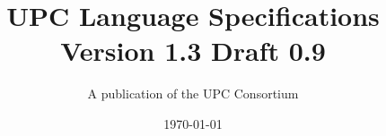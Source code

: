 \newcommand{\myversion}{Version 1.3 Draft 0.9}
\newcommand{\mytitle}{UPC Language Specifications}


\makeindex

\title{\mytitle\\
\myversion}

\author{A publication of the UPC Consortium}

\date {\today}



\maketitle

\setcounter{page}{2}


\newpage
\setlength {\parskip}{0ex}
\tableofcontents                                             
\setlength {\parskip}{1.3ex}
\newpage








\appendix





\pagebreak
\setcounter{section}{0}
\printindex

